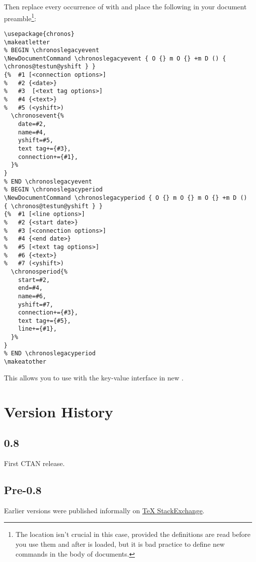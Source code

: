 \documentclass[10pt,british,a4paper]{ltxdoc}
\newcommand*\pkg[1]{\textpkg{#1}}
\begin{document}
\begin{chronosmethod}
\begin{chronosmethod}
    Then replace every occurrence of  with  and place the following in your document preamble\footnote{The location isn't crucial in this case, provided the definitions are read before you use them and after \pkg{chronos} is loaded, but it is bad practice to define new commands in the body of documents.}:
\begin{verbatim}
\usepackage{chronos}
\makeatletter
% BEGIN \chronoslegacyevent
\NewDocumentCommand \chronoslegacyevent { O {} m O {} +m D () { \chronos@testun@yshift } }
{%  #1 [<connection options>] 
%   #2 {<date>} 
%   #3  [<text tag options>] 
%   #4 {<text>} 
%   #5 (<yshift>)
  \chronosevent{%
    date=#2,
    name=#4,
    yshift=#5,
    text tag+={#3},
    connection+={#1},
  }%
}
% END \chronoslegacyevent
% BEGIN \chronoslegacyperiod
\NewDocumentCommand \chronoslegacyperiod { O {} m O {} m O {} +m D () { \chronos@testun@yshift } }
{%  #1 [<line options>] 
%   #2 {<start date>} 
%   #3 [<connection options>] 
%   #4 {<end date>} 
%   #5 [<text tag options>] 
%   #6 {<text>} 
%   #7 (<yshift>)
  \chronosperiod{%
    start=#2,
    end=#4,
    name=#6,
    yshift=#7,
    connection+={#3},
    text tag+={#5},
    line+={#1},
  }%
}
% END \chronoslegacyperiod
\makeatother
\end{verbatim}
    This allows you to use  with the key-value interface in new .
  \end{chronosmethod}
\end{chronosmethod}



\section{Version History}\label{sec:hanes}

\subsection{0.8}\label{subsec:0.8}

First CTAN release.


\subsection{Pre-0.8}\label{subsec:Pre-0.8}


Earlier versions were published informally on \href{https:tex.stackexchange.com}{\TeX{} StackExchange}.



\printindex
\end{document}
